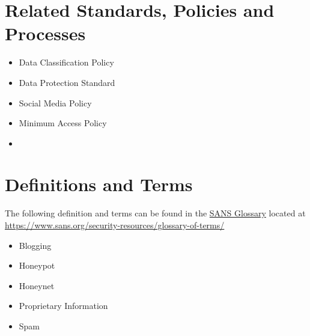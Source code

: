 \CommonPolicyCompliance
\section{Related Standards, Policies and Processes}
\begin{itemize}
\item Data Classification Policy
\item Data Protection Standard
\item Social Media Policy
\item Minimum Access Policy
\item {}
\end{itemize}


\section{Definitions and Terms}
The following definition and terms can be found in the \href{https://www.sans.org/security-resources/glossary-of-terms/}{SANS Glossary} located at \url{https://www.sans.org/security-resources/glossary-of-terms/}
\begin{itemize}
\item Blogging
\item Honeypot
\item Honeynet
\item Proprietary Information
\item Spam
\end{itemize}

\CommonRevisionHistory